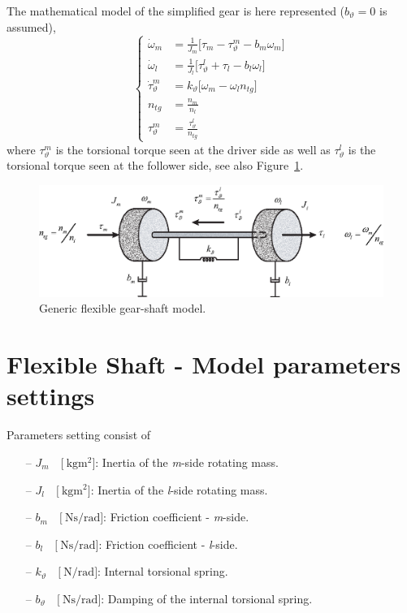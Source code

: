 \documentclass[11pt,a4paper]{article}
\numberwithin{equation}{section}
\theoremstyle{it}
\theoremstyle{definition}
\begin{document}
The mathematical model of the simplified gear is here represented ($b_\vartheta=0$ is assumed), 
\begin{equation}\left\lbrace 
	\begin{aligned}
		\dot{\omega}_m &= \frac{1}{J_m}\Big[\tau_m - \tau_\vartheta^m - b_m\omega_m\Big] \\[8pt]
		\dot{\omega}_l &= \frac{1}{J_l}\Big[\tau_\vartheta^l + \tau_l - b_l\omega_l \Big] \\[8pt]
		\dot{\tau}_\vartheta^m &= k_\vartheta\Big[\omega_m -\omega_l n_{tg} \Big] \\[8pt]
		n_{tg} &= \frac{n_m}{n_l} \\[8pt]
		\tau_\vartheta^m &=\frac{\tau_\vartheta^l}{n_{tg}}
	\end{aligned}\right. 
\end{equation}
where $\tau_\vartheta^m$ is the torsional torque seen at the driver side as well as $\tau_\vartheta^l$ is the torsional torque seen at the follower side, see also Figure~\ref{figure_gear_flexshaft}.
\begin{figure}[H]
	\centering
	\includegraphics[width = 400pt, keepaspectratio] {figures/msm/gear_flexshaft_2.eps}
	\captionsetup{width=0.5\textwidth}		
	\caption{Generic flexible gear-shaft model.}
	\label{figure_gear_flexshaft}
\end{figure}

\section{Flexible Shaft - Model parameters settings}
Parameters setting consist of
\begin{itemize}
	\item[--] $J_m\quad\Big[\SI{}{\kilo\gram\square\meter}\Big]$: Inertia of the \textit{m}-side rotating mass.
	\item[--] $J_l\quad\Big[\SI{}{\kilo\gram\square\meter}\Big]$: Inertia of the \textit{l}-side rotating mass.
	\item[--] $b_m\quad\Big[\SI{}{\newton\second\per\radian}\Big]$: Friction coefficient - \textit{m}-side.
	\item[--] $b_l\quad\Big[\SI{}{\newton\second\per\radian}\Big]$: Friction coefficient - \textit{l}-side.
	\item[--] $k_\vartheta\quad\Big[\SI{}{\newton\per\radian}\Big]$: Internal torsional spring.	
	\item[--] $b_\vartheta\quad\Big[\SI{}{\newton\second\per\radian}\Big]$: Damping of the internal torsional spring.
\end{itemize}
\end{document}
